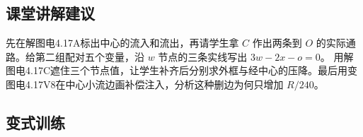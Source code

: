 \documentclass[UTF8,fontset=fandol,a4paper,11pt]{ctexart}
\begin{document}

\subsection*{课堂讲解建议}

先在解图电4.17A标出中心的流入和流出，再请学生拿 $C$ 作出两条到 $O$ 的实际通路。给第二组配对五个变量，沿 $w$ 节点的三条实线写出 $3w-2x-o=0$。
用解图电4.17C遮住三个节点值，让学生补齐后分别求外框与经中心的压降。最后用变图电4.17V8在中心小流边画补偿注入，分析这种删边为何只增加 $R/240$。


\subsection*{变式训练}
\end{document}
